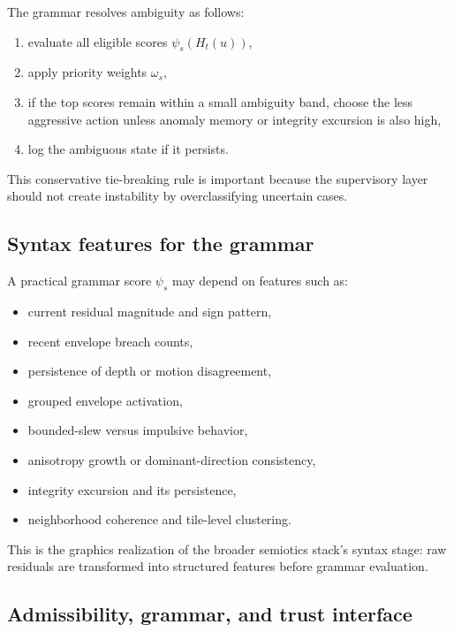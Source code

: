 \documentclass[11pt,letterpaper]{article}
\theoremstyle{gcresult}
\theoremstyle{definition}
\begin{document}
The grammar resolves ambiguity as follows:
\begin{enumerate}[leftmargin=1.5em]
    \item evaluate all eligible scores $\psi_s(H_t(u))$,
    \item apply priority weights $\omega_s$,
    \item if the top scores remain within a small ambiguity band, choose the less aggressive action unless anomaly memory or integrity excursion is also high,
    \item log the ambiguous state if it persists.
\end{enumerate}

This conservative tie-breaking rule is important because the supervisory layer should not create instability by overclassifying uncertain cases.


\subsection{Syntax features for the grammar}

A practical grammar score $\psi_s$ may depend on features such as:
\begin{itemize}[leftmargin=1.5em]
    \item current residual magnitude and sign pattern,
    \item recent envelope breach counts,
    \item persistence of depth or motion disagreement,
    \item grouped envelope activation,
    \item bounded-slew versus impulsive behavior,
    \item anisotropy growth or dominant-direction consistency,
    \item integrity excursion and its persistence,
    \item neighborhood coherence and tile-level clustering.
\end{itemize}

This is the graphics realization of the broader semiotics stack’s syntax stage: raw residuals are transformed into structured features before grammar evaluation.


\subsection{Admissibility, grammar, and trust interface}
\end{document}
